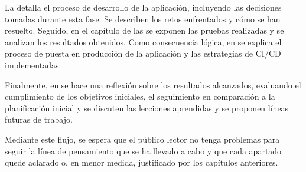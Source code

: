 La  detalla el proceso de desarrollo de la aplicación, incluyendo las decisiones tomadas durante esta fase. Se describen los retos enfrentados y cómo se han resuelto. Seguido, en el capítulo de las  se exponen las pruebas realizadas y se analizan los resultados obtenidos. Como consecuencia lógica, en  se explica el proceso de puesta en producción de la aplicación y las estrategias de CI/CD implementadas.

Finalmente, en  se hace una reflexión sobre los resultados alcanzados, evaluando el cumplimiento de los objetivos iniciales, el seguimiento en comparación a la planificación inicial y se discuten las lecciones aprendidas y se proponen líneas futuras de trabajo.

Mediante este flujo, se espera que el público lector no tenga problemas para seguir la línea de pensamiento que se ha llevado a cabo y que cada apartado quede aclarado o, en menor medida, justificado por los capítulos anteriores.
